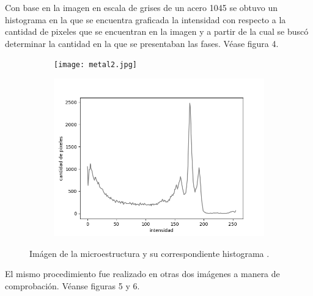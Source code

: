 \documentclass[12pt,twocolumn]{article}
\begin{document}
Con base en la imagen \cite{metal2}en escala de grises de un acero 1045 \cite{ref1} se obtuvo un histograma en la que se encuentra graficada la intensidad con respecto a la cantidad de pixeles que se encuentran en la imagen y a partir de la cual se busc\'o determinar la cantidad en la que se presentaban las fases. V\'ease figura 4.

\begin{figure}[H]
       \centering
       \begin{subfigure}[b]{0.4\linewidth}
           \texttt{[image: metal2.jpg]}
           \label{fig:westminster_lateral}
        \end{subfigure}

        \begin{subfigure}[b]{0.6\linewidth}
            \includegraphics[width=\linewidth]{histograma2.png}
            \label{fig:westminster_lateral}
         \end{subfigure}
         \caption{Im\'agen de la microestructura y su correspondiente histograma \cite{metal}.}
\end{figure}

El mismo procedimiento fue realizado en otras dos im\'agenes a manera de comprobaci\'on. V\'eanse figuras 5 y 6.
\end{document}
